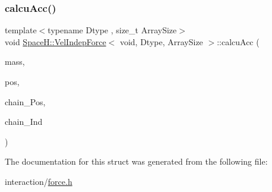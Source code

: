 \mbox{\label{struct_space_h_1_1_vel_indep_force_3_01void_00_01_dtype_00_01_array_size_01_4_a9aefde5ef77e7fa4ecb8ab141136e45e}} 
\subsubsection{\texorpdfstring{calcu\+Acc()}{calcuAcc()}\hspace{0.1cm}{\footnotesize\ttfamily [2/2]}}
{\footnotesize\ttfamily template$<$typename Dtype , size\+\_\+t Array\+Size$>$ \\
void \mbox{\hyperlink{struct_space_h_1_1_vel_indep_force}{Space\+H\+::\+Vel\+Indep\+Force}}$<$ void, Dtype, Array\+Size $>$\+::calcu\+Acc (\begin{DoxyParamCaption}\item[{const \mbox{\hyperlink{struct_space_h_1_1_vel_indep_force_3_01void_00_01_dtype_00_01_array_size_01_4_abac00e98d91b617794c41acf2a4ee4d5}{Scalar\+Array}} \&}]{mass,  }\item[{const \mbox{\hyperlink{struct_space_h_1_1_vel_indep_force_3_01void_00_01_dtype_00_01_array_size_01_4_ab547eb9c08979f28c5afafae93480702}{Vector\+Array}} \&}]{pos,  }\item[{const \mbox{\hyperlink{struct_space_h_1_1_vel_indep_force_3_01void_00_01_dtype_00_01_array_size_01_4_ab547eb9c08979f28c5afafae93480702}{Vector\+Array}} \&}]{chain_\+Pos,  }\item[{const \mbox{\hyperlink{struct_space_h_1_1_vel_indep_force_3_01void_00_01_dtype_00_01_array_size_01_4_ac09f6af9183141c8f56422420ce85302}{Index\+Array}} \&}]{chain_\+Ind }\end{DoxyParamCaption})\hspace{0.3cm}{\ttfamily [inline]}}



The documentation for this struct was generated from the following file\+:\begin{DoxyCompactItemize}
\item 
interaction/\mbox{\hyperlink{force_8h}{force.\+h}}\end{DoxyCompactItemize}
